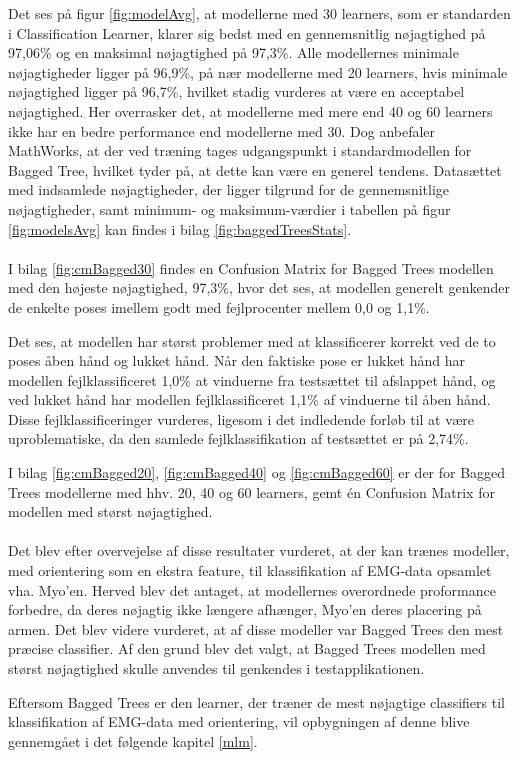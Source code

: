 Det ses på figur \ref{fig:modelAvg}, at modellerne med 30 learners, som er standarden i Classification Learner, klarer sig bedst med en gennemsnitlig nøjagtighed på 97,06\% og en maksimal nøjagtighed på 97,3\%. Alle modellernes minimale nøjagtigheder ligger på 96,9\%, på nær modellerne med 20 learners, hvis minimale nøjagtighed ligger på 96,7\%, hvilket stadig vurderes at være en acceptabel nøjagtighed. Her overrasker det, at modellerne med mere end 40 og 60 learners ikke har en bedre performance end modellerne med 30. Dog anbefaler MathWorks, at der ved træning tages udgangspunkt i standardmodellen for 
Bagged Tree\citep{matFastModels}, hvilket tyder på, at dette kan være en generel tendens. Datasættet med indsamlede nøjagtigheder, der ligger tilgrund for de gennemsnitlige nøjagtigheder, samt minimum- og maksimum-værdier i tabellen på figur \ref{fig:modelsAvg} kan findes i bilag \ref{fig:baggedTreesStats}.\\\\
I bilag \ref{fig:cmBagged30} findes en Confusion Matrix for Bagged Trees modellen med den højeste nøjagtighed, 97,3\%, hvor det ses, at modellen generelt genkender de enkelte poses imellem godt med fejlprocenter mellem 0,0 og 1,1\%. 

Det ses, at modellen har størst problemer med at klassificerer korrekt ved de to poses åben hånd og lukket hånd. Når den faktiske pose er lukket hånd har modellen fejlklassificeret 1,0\% at vinduerne fra testsættet til afslappet hånd, og ved lukket hånd har modellen fejlklassificeret 1,1\% af vinduerne til åben hånd. 
Disse fejlklassificeringer vurderes, ligesom i det indledende forløb til at være uproblematiske, da den samlede fejlklassifikation af testsættet er på 2,74\%. 

I bilag \ref{fig:cmBagged20}, \ref{fig:cmBagged40} og \ref{fig:cmBagged60} er der for Bagged Trees modellerne med hhv. 20, 40 og 60 learners, gemt én Confusion Matrix for modellen med størst nøjagtighed.\\\\
Det blev efter overvejelse af disse resultater vurderet, at der kan trænes modeller, med orientering som en ekstra feature, til klassifikation af EMG-data opsamlet vha. Myo'en. Herved blev det antaget, at modellernes overordnede proformance forbedre, da deres nøjagtig ikke længere afhænger, Myo'en deres placering på armen. Det blev videre vurderet, at af disse modeller var Bagged Trees den mest præcise classifier. Af den grund blev det valgt, at Bagged Trees modellen med størst nøjagtighed skulle anvendes til genkendes i testapplikationen. 

Eftersom Bagged Trees er den learner, der træner de mest nøjagtige classifiers til klassifikation af EMG-data med orientering, vil opbygningen af denne blive gennemgået i det følgende kapitel \ref{mlm}.
 